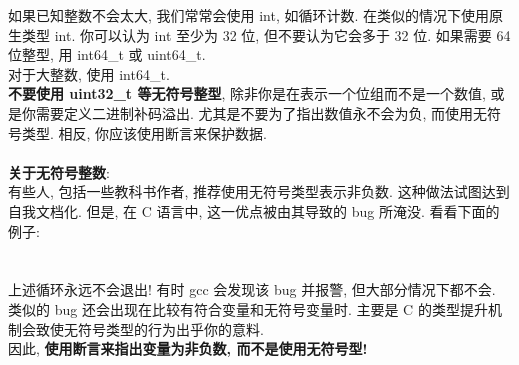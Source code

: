\documentclass[a4paper,11pt,CJK]{article}
\begin{document}
\begin{CJK}{UTF8}{gbsn}
\indent 如果已知整数不会太大, 我们常常会使用 int, 如循环计数. 在类似的情况下使用原生类型 int. 你可以认为 int 至少为 32 位, 但不要认为它会多于 32 位. 如果需要 64 位整型, 用 int64\_t 或 uint64\_t.\\
\indent 对于大整数, 使用 int64\_t.\\
\indent \textbf{不要使用 uint32\_t 等无符号整型}, 除非你是在表示一个位组而不是一个数值, 或是你需要定义二进制补码溢出. 尤其是不要为了指出数值永不会为负, 而使用无符号类型. 相反, 你应该使用断言来保护数据.\\
\\
\textbf{关于无符号整数}:\\
\indent 有些人, 包括一些教科书作者, 推荐使用无符号类型表示非负数. 这种做法试图达到自我文档化. 但是, 在 C 语言中, 这一优点被由其导致的 bug 所淹没. 看看下面的例子:\\
\\
\\
\indent 上述循环永远不会退出! 有时 gcc 会发现该 bug 并报警, 但大部分情况下都不会. 类似的 bug 还会出现在比较有符合变量和无符号变量时. 主要是 C 的类型提升机制会致使无符号类型的行为出乎你的意料.\\
\indent 因此, \textbf{使用断言来指出变量为非负数, 而不是使用无符号型!}\\


\end{CJK}
\end{document}
